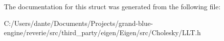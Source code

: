 The documentation for this struct was generated from the following file\+:\begin{DoxyCompactItemize}
\item 
C\+:/\+Users/dante/\+Documents/\+Projects/grand-\/blue-\/engine/reverie/src/third\+\_\+party/eigen/\+Eigen/src/\+Cholesky/L\+L\+T.\+h\end{DoxyCompactItemize}
